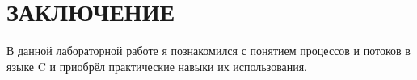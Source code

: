 \section*{ЗАКЛЮЧЕНИЕ}

В данной лабораторной работе я познакомился с понятием процессов и потоков в языке C и приобрёл практические навыки их использования.

\newpage